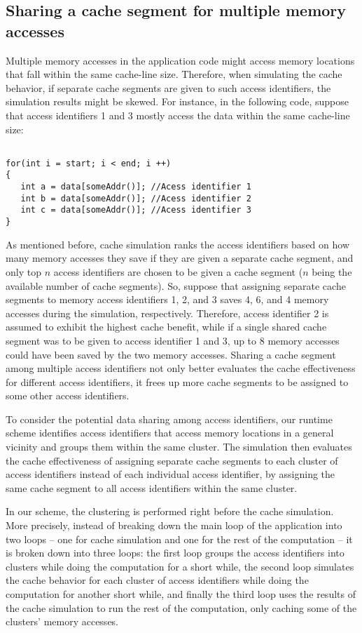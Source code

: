 \subsection{Sharing a cache segment for multiple memory accesses}

Multiple memory accesses in the application code might access memory locations that fall within the same cache-line
size. Therefore, when simulating the cache behavior, if separate cache segments are given to such access
identifiers, the simulation results might be skewed. For instance, in the following code, suppose that access
identifiers 1 and 3 mostly access the data within the same cache-line size:

\begin{verbatim}

for(int i = start; i < end; i ++)
{
   int a = data[someAddr()]; //Acess identifier 1
   int b = data[someAddr()]; //Acess identifier 2
   int c = data[someAddr()]; //Acess identifier 3
}

\end{verbatim}

As mentioned before, cache simulation ranks the access identifiers based on how many memory accesses they save if they
are given a separate cache segment, and only top $n$ access identifiers are chosen to be given a cache segment ($n$ being the
available number of cache segments). So, suppose that assigning separate cache segments to memory access identifiers 1,
2, and 3 saves 4, 6, and 4 memory accesses during the simulation, respectively. Therefore, access identifier 2 is
assumed to exhibit the highest cache benefit, while if a single shared cache segment was to be given to access
identifier 1 and 3, up to 8 memory accesses could have been saved by the two memory accesses. Sharing a cache segment
among multiple access identifiers not only better evaluates the cache effectiveness for different access identifiers, it
frees up more cache segments to be assigned to some other access identifiers.

To consider the potential data sharing among access identifiers, our runtime scheme identifies access identifiers that
access memory locations in a general vicinity and groups them within the same cluster. The simulation then evaluates
the cache effectiveness of assigning separate cache segments to each cluster of access identifiers instead of each
individual access identifier, by assigning the same cache segment to all access identifiers within the same cluster.


In our scheme, the clustering is performed right before the cache simulation. More precisely, instead of breaking down
the main loop of the application into two loops -- one for cache simulation and one for the rest of the computation --
it is broken down into three loops: the first loop groups the access identifiers into clusters while doing the
computation for a short while, the second loop simulates the cache behavior for each cluster of access identifiers while
doing the computation for another short while, and finally the third loop uses the results of the cache simulation to
run the rest of the computation, only caching some of the clusters' memory accesses.



